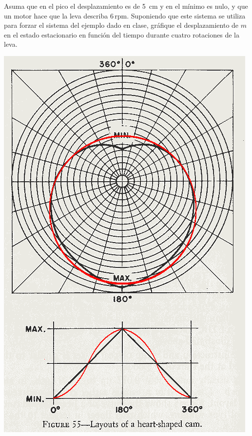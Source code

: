 \documentclass[11pt, spanish, a4paper, twopage]{article}
\begin{document}
\begin{enumerate}
\begin{minipage}[t][3.5cm]{0.75\textwidth}
Asuma que en el pico el desplazamiento es de \SI{5}{\centi\metre} y en el mínimo es nulo, y que un motor hace que la leva describa $6\,\mathrm{rpm}$.  
Suponiendo que este sistema se utiliza para forzar el sistema del ejemplo dado en clase, gráfique el desplazamiento de $m$ en el estado estacionario en función del tiempo durante cuatro rotaciones de la leva.
\end{minipage}
\begin{minipage}[c][2cm][t]{0.2\textwidth}
	\includegraphics[width=\textwidth]{figures/nok_wikkelmachine}
\end{minipage}




\end{enumerate}
\end{document}

